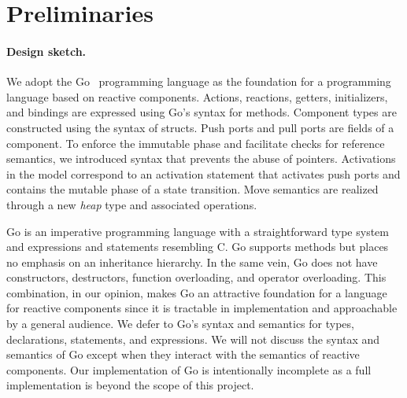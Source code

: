 
\section{Preliminaries}

\paragraph{Design sketch.}
We adopt the Go~\cite{go} programming language as the foundation for a programming language based on reactive components.
Actions, reactions, getters, initializers, and bindings are expressed using Go's syntax for methods.
Component types are constructed using the syntax of structs.
Push ports and pull ports are fields of a component.
To enforce the immutable phase and facilitate checks for reference semantics, we introduced syntax that prevents the abuse of pointers.
Activations in the model correspond to an activation statement that activates push ports and contains the mutable phase of a state transition.
Move semantics are realized through a new \emph{heap} type and associated operations.

Go is an imperative programming language with a straightforward type system and expressions and statements resembling C.
Go supports methods but places no emphasis on an inheritance hierarchy.
In the same vein, Go does not have constructors, destructors, function overloading, and operator overloading.
This combination, in our opinion, makes Go an attractive foundation for a language for reactive components since it is tractable in implementation and approachable by a general audience.
We defer to Go's syntax and semantics for types, declarations, statements, and expressions.
We will not discuss the syntax and semantics of Go except when they interact with the semantics of reactive components.
Our implementation of Go is intentionally incomplete as a full implementation is beyond the scope of this project.

